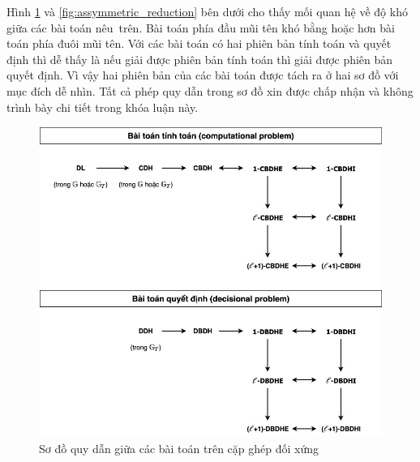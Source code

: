 \documentclass[class=report, crop=false]{standalone}
\begin{document}
			Hình \ref{fig:symmetric_reduction} và \ref{fig:assymmetric_reduction} bên dưới cho thấy mối quan hệ về độ khó giữa các bài toán nêu~trên. Bài toán phía đầu mũi tên khó bằng hoặc hơn bài toán phía đuôi mũi tên. Với các bài toán có hai phiên bản tính toán và quyết định thì dễ thấy là nếu giải được phiên bản tính toán thì giải được phiên bản quyết định. Vì vậy hai phiên bản của các bài toán được tách ra ở hai sơ đồ với mục đích dễ nhìn. Tất cả phép quy dẫn trong sơ đồ xin được chấp nhận và không trình bày chi tiết trong khóa luận này.
			\newpage
			\begin{figure}[h]
				\captionsetup{font=normalsize}
				\includegraphics[width=\textwidth]{symmetric_problem_reduction.jpg}
				\centering
				\caption{Sơ đồ quy dẫn giữa các bài toán trên cặp ghép đối xứng}
				\label{fig:symmetric_reduction}
			\end{figure}
			\newpage
\end{document}
